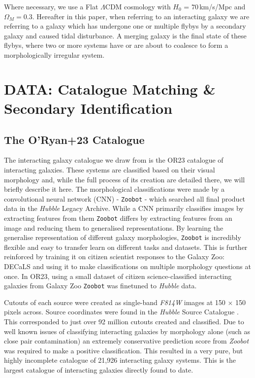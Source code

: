 \documentclass[fleqn,usenatbib]{mnras}
\begin{document}
Where necessary, we use a Flat $\Lambda$CDM cosmology with $H_0$ = $70$\,km/s/Mpc and $\Omega_M = 0.3$. Hereafter in this paper, when referring to an interacting galaxy we are referring to a galaxy which has undergone one or multiple flybys by a secondary galaxy and caused tidal disturbance. A merging galaxy is the final state of these flybys, where two or more systems have or are about to coalesce to form a morphologically irregular system.

\section{DATA: Catalogue Matching \& Secondary Identification} \label{data}
\subsection{The O'Ryan+23 Catalogue}
\noindent The interacting galaxy catalogue we draw from is the OR23 catalogue of interacting galaxies. These systems are classified based on their visual morphology and, while the full process of its creation are detailed there, we will briefly describe it here. The morphological classifications were made by a convolutional neural network (CNN) - \texttt{Zoobot} - which searched all final product data in the \textit{Hubble} Legacy Archive. While a CNN primarily classifies images by extracting features from them \texttt{Zoobot} differs by extracting features from an image and reducing them to generalised representations. By learning the generalise representation of different galaxy morphologies, \texttt{Zoobot} is incredibly flexible and easy to transfer learn on different tasks and datasets. This is further reinforced by training it on citizen scientist responses to the Galaxy Zoo: DECaLS \citep{2022MNRAS.509.3966W} and using it to make classifications on multiple morphology questions at once. In OR23, using a small dataset of citizen science-classified interacting galaxies from Galaxy Zoo \citep{2008MNRAS.389.1179L} \texttt{Zoobot} was finetuned to \textit{Hubble} data.

Cutouts of each source were created as single-band \textit{F814W} images at 150 $\times$ 150 pixels across. Source coordinates were found in the \textit{Hubble} Source Catalogue \citep{2016AJ....151..134W}. This corresponded to just over 92 million cutouts created and classified. Due to well known issues of classifying interacting galaxies by morphology alone (such as close pair contamination) an extremely conservative prediction score from \textit{Zoobot} was required to make a positive classification. This resulted in a very pure, but highly incomplete catalogue of 21,926 interacting galaxy systems. This is the largest catalogue of interacting galaxies directly found to date.
\end{document}
